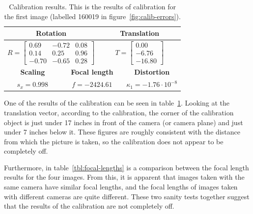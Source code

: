 \begin{table}[htb]
  \centering
  \begin{tabular}{c c c c c c}
    \toprule
    \multicolumn{3}{c}{\textbf{Rotation}} & \multicolumn{3}{c}{\textbf{Translation}}\\
    \midrule
    \multicolumn{3}{c}{$R=\begin{bmatrix}0.69 & -0.72 & 0.08\\
    0.14 & 0.25 & 0.96\\
    -0.70 & -0.65 & 0.28\end{bmatrix}$} &
    \multicolumn{3}{c}{$T=\begin{bmatrix}0.00\\-6.76\\-16.80\end{bmatrix}$} \\
    \midrule
    \multicolumn{2}{c}{\textbf{Scaling}} &
    \multicolumn{2}{c}{\textbf{Focal length}} &
    \multicolumn{2}{c}{\textbf{Distortion}}\\
    \midrule
    \multicolumn{2}{c}{$s_x =0.998$} &
    \multicolumn{2}{c}{$f=-2424.61$} &
    \multicolumn{2}{c}{$\kappa_1=-1.76 \cdot 10^{-8}$}\\
    \bottomrule
  \end{tabular}
  \caption[Calibration results]{Calibration results. This is the
    results of calibration for the first image (labelled 160019 in
    figure~\ref{fig:calib-errors}).}
  \label{tbl:calib-results}
\end{table}

One of the results of the calibration can be seen in
table~\ref{tbl:calib-results}. Looking at the translation vector,
according to the calibration, the corner of the calibration object is
just under 17 inches in front of the camera (or camera plane) and just
under 7 inches below it. These figures are roughly consistent with the
distance from which the picture is taken, so the calibration does not
appear to be completely off.

Furthermore, in table~\ref{tbl:focal-lengths} is a comparison
between the focal length results for the four images. From this, it is
apparent that images taken with the same camera have similar focal
lengths, and the focal lengths of images taken with different cameras
are quite different. These two sanity tests together suggest that the
results of the calibration are not completely off.

